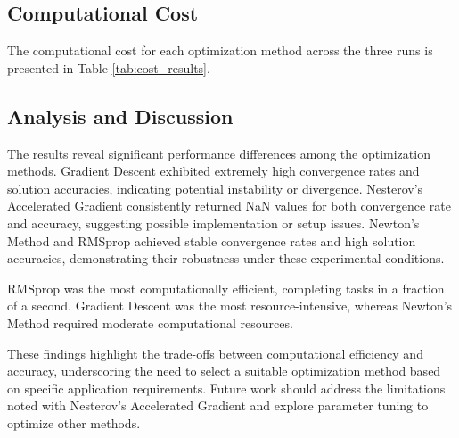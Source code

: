 \documentclass[11pt]{article}
\begin{document}
\subsection{Computational Cost}

The computational cost for each optimization method across the three runs is presented in Table \ref{tab:cost_results}.


\begin{table}[h]
 \centering
 \caption{Computational cost of different optimization methods over three runs.}
 \label{tab:cost_results}
\end{table}


\subsection{Analysis and Discussion}

The results reveal significant performance differences among the optimization methods. Gradient Descent exhibited extremely high convergence rates and solution accuracies, indicating potential instability or divergence. Nesterov's Accelerated Gradient consistently returned NaN values for both convergence rate and accuracy, suggesting possible implementation or setup issues. Newton's Method and RMSprop achieved stable convergence rates and high solution accuracies, demonstrating their robustness under these experimental conditions.

RMSprop was the most computationally efficient, completing tasks in a fraction of a second. Gradient Descent was the most resource-intensive, whereas Newton's Method required moderate computational resources.

These findings highlight the trade-offs between computational efficiency and accuracy, underscoring the need to select a suitable optimization method based on specific application requirements. Future work should address the limitations noted with Nesterov's Accelerated Gradient and explore parameter tuning to optimize other methods.
\end{document}
